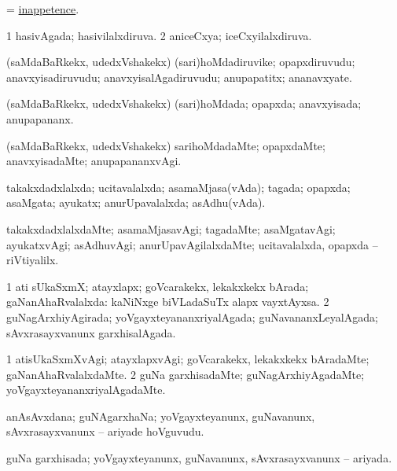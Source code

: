 \bentry
{}
\gl{\nA}
\bmng
 = \hyperlink{inappetence}{inappetence}. 
\emng
\eentry

\bentry
{}
\gl{\gu}
\bmng
\bnum
\num{1} hasivAgada; hasivilalxdiruva. 
\num{2} aniceCxya; iceCxyilalxdiruva. 
\enum
\emng
\eentry

\bentry
{}
\gl{\nA}
\bmng
(saMdaBaRkekx, udedxVshakekx) (sari)hoMdadiruvike; opapxdiruvudu; anavxyisadiruvudu; anavxyisalAgadiruvudu; anupapatitx; ananavxyate. 
\emng
\eentry

\bentry
{}
\gl{\gu}
\bmng
(saMdaBaRkekx, udedxVshakekx) (sari)hoMdada; opapxda; anavxyisada; anupapananx. 
\emng
\eentry

\bentry
{}
\gl{\kirxvi}
\bmng
(saMdaBaRkekx, udedxVshakekx) sarihoMdadaMte; opapxdaMte; anavxyisadaMte; anupapananxvAgi. 
\emng
\eentry

\bentry
{}
\gl{\gu}
\bmng
takakxdadxlalxda; ucitavalalxda; asamaMjasa(vAda); tagada; opapxda; asaMgata; ayukatx; anurUpavalalxda; asAdhu(vAda). 
\emng
\eentry

\bentry
{}
\gl{\kirxvi}
\bmng
takakxdadxlalxdaMte; asamaMjasavAgi; tagadaMte; asaMgatavAgi; ayukatxvAgi; asAdhuvAgi; anurUpavAgilalxdaMte; ucitavalalxda, opapxda -- riVtiyalilx. 
\emng
\eentry


\bentry
{}
\gl{\gu}
\bmng
\bnum
\num{1} ati sUkaSxmX; atayxlapx; goVcarakekx, lekakxkekx bArada; gaNanAhaRvalalxda:  kaNiNxge biVLadaSuTx alapx vayxtAyxsa. 
\num{2} guNagArxhiyAgirada; yoVgayxteyananxriyalAgada; guNavananxLeyalAgada; sAvxrasayxvanunx garxhisalAgada. 
\enum
\emng
\eentry

\bentry
{}
\gl{\kirxvi}
\bmng
\bnum
\num{1} atisUkaSxmXvAgi; atayxlapxvAgi; goVcarakekx, lekakxkekx bAradaMte; gaNanAhaRvalalxdaMte. 
\num{2} guNa garxhisadaMte; guNagArxhiyAgadaMte; yoVgayxteyananxriyalAgadaMte. 
\enum
\emng
\eentry

\bentry
{}
\gl{\nA}
\bmng
anAsAvxdana; guNAgarxhaNa; yoVgayxteyanunx, guNavanunx, sAvxrasayxvanunx -- ariyade hoVguvudu. 
\emng
\eentry

\bentry
{}
\gl{\gu}
\bmng
guNa garxhisada; yoVgayxteyanunx, guNavanunx, sAvxrasayxvanunx -- ariyada. 
\emng
\eentry

